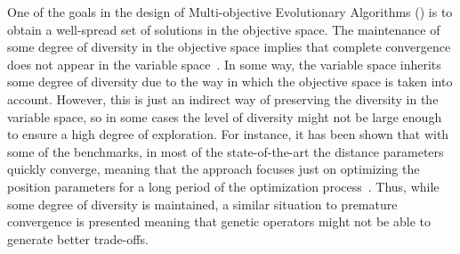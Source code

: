 One of the goals in the design of Multi-objective Evolutionary Algorithms (\MOEAS{}) is to obtain a well-spread 
set of solutions in the objective space.
%
The maintenance of some degree of diversity in the objective space implies that complete convergence 
does not appear in the variable space~\cite{Joel:GDE3_CEC09}.
%
In some way, the variable space inherits some degree of diversity due to the way in which the objective space is 
taken into account. 
%
However, this is just an indirect way of preserving the diversity in the variable space, so 
in some cases the level of diversity might not be large enough to ensure a high degree of exploration.
%
For instance, it has been shown that with some of the \WFG{} benchmarks, in most of the state-of-the-art \MOEAS{} 
the distance parameters quickly converge, meaning that the approach focuses just on optimizing the 
position parameters for a long period of the optimization process~\cite{Joel:GDE3_CEC09}.
%
Thus, while some degree of diversity is maintained, a similar situation to premature convergence is presented
meaning that genetic operators might not be able to generate better trade-offs. 

